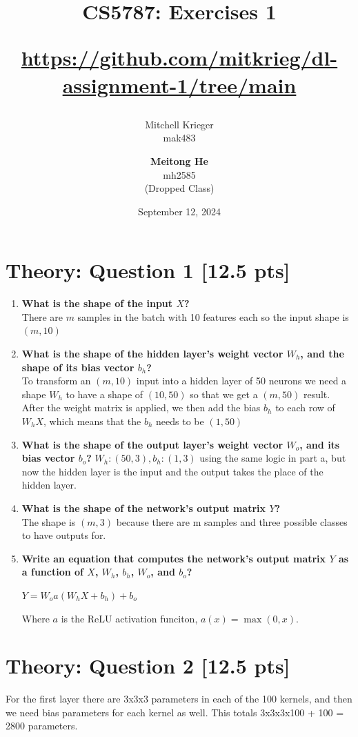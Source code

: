 \documentclass{article}
\title{CS5787: Exercises 1 \\ \begin{small}\url{https://github.com/mitkrieg/dl-assignment-1/tree/main}\end{small}}
\author{Mitchell Krieger \\ mak483 \and \textbf{Meitong He} \\ mh2585 \\ (Dropped Class)}
\date{September 12, 2024}
\begin{document}
\maketitle

\section{Theory: Question 1 [12.5 pts]}

\begin{enumerate}[label=\alph*.]
    \item \textbf{What is the shape of the input $X$?} \\ There are $m$ samples in the batch with 10 features each so the input shape is $(m, 10)$ 
    \item \textbf{What is the shape of the hidden layer's weight vector $W_h$, and the shape of its bias vector $b_h$?} \\ To transform an $(m, 10)$ input into a hidden layer of 50 neurons we need a shape $W_h$ to have a shape of $(10, 50)$ so that we get a $(m, 50)$ result. After the weight matrix is applied, we then add the bias $b_h$ to each row of $W_hX$, which means that the $b_h$ needs to be $(1, 50)$
    \item \textbf{What is the shape of the output layer's weight vector $W_o$, and its bias vector $b_o$?} $W_h: (50, 3), b_h: (1, 3)$ using the same logic in part a, but now the hidden layer is the input and the output takes the place of the hidden layer.
    \item \textbf{What is the shape of the network's output matrix $Y$?} \\ The shape is $(m, 3)$ because there are m samples and three possible classes to have outputs for.
    \item \textbf{Write an equation that computes the network's output matrix $Y$ as a function of $X$, $W_h$, $b_h$, $W_o$, and $b_o$?}
    
          $Y = W_oa(W_hX+b_h)+b_o$ 

          Where $a$ is the ReLU activation funciton, $a(x) = \max(0,x)$.
\end{enumerate}

\section{Theory: Question 2 [12.5 pts]}

For the first layer there are 3x3x3 parameters in each of the 100 kernels, and then we need bias parameters for each kernel as well. This totals 3x3x3x100 + 100 = 2800 parameters. 
\end{document}
